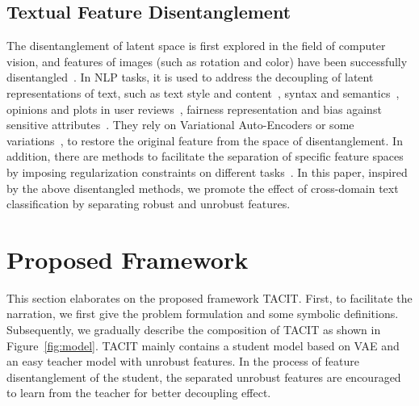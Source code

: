 \documentclass[letterpaper]{article} %
\begin{document}
\subsection{Textual Feature Disentanglement}
The disentanglement of latent space is first explored in the field of computer vision, and features of images (such as rotation and color) have been successfully disentangled~\cite{ChenCDHSSA16}. In NLP tasks, it is used to address the decoupling of latent representations of text, such as text style and content~\cite{JohnMBV19}, syntax and semantics~\cite{BaoZHLMVDC19}, opinions and plots in user reviews~\cite{PergolaGH21}, fairness representation and bias against sensitive attributes~\cite{ColomboSNP22}. They rely on Variational Auto-Encoders or some variations~\cite{KingmaW13}, to restore the original feature from the space of disentanglement. In addition, there are methods to facilitate the separation of specific feature spaces by imposing regularization constraints on different tasks~\cite{JohnMBV19, HuangZCWY21}. In this paper, inspired by the above disentangled methods, we promote the effect of cross-domain text classification by separating robust and unrobust features.

\section{Proposed Framework}
This section elaborates on the proposed framework TACIT. First, to facilitate the narration, we first give the problem formulation and some symbolic definitions. Subsequently, we gradually describe the composition of TACIT as shown in Figure~\ref{fig:model}. TACIT mainly contains a student model based on VAE and an easy teacher model with unrobust features. In the process of feature disentanglement of the student, the separated unrobust features are encouraged to learn from the teacher for better decoupling effect.
\end{document}
